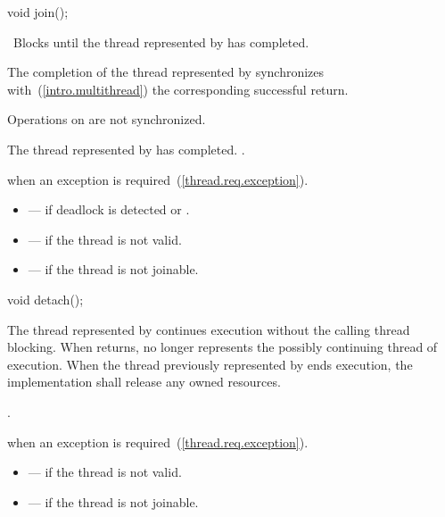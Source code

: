 \begin{itemdescr}
\pnum
\returns {}
\end{itemdescr}

%
%
\begin{itemdecl}
void join();
\end{itemdecl}

\begin{itemdescr}
\pnum
\effects\ Blocks until the thread represented by  has completed.

\pnum
\sync The completion of the thread represented by  synchronizes with~(\ref{intro.multithread})
the corresponding successful
 return. \begin{note} Operations on
 are not synchronized. \end{note}

\pnum
\postconditions The thread represented by  has completed. .

\pnum
\throws {} when
an exception is required~(\ref{thread.req.exception}).

\pnum
\errors
\begin{itemize}
\item {} --- if deadlock is detected or
.

\item {} --- if the thread is not valid.

\item {} --- if the thread is not joinable.
\end{itemize}
\end{itemdescr}

%
%
\begin{itemdecl}
void detach();
\end{itemdecl}

\begin{itemdescr}
\pnum
\effects The thread represented by  continues execution without the calling thread
blocking. When  returns,  no longer represents the possibly continuing
thread of execution. When the thread previously represented by  ends execution, the
implementation shall release any owned resources.

\pnum\postcondition {}.

\pnum\throws {} when
an exception is required~(\ref{thread.req.exception}).

\pnum \errors
\begin{itemize}
\item {} --- if the thread is not valid.
\item {} --- if the thread is not joinable.
\end{itemize}
\end{itemdescr}

